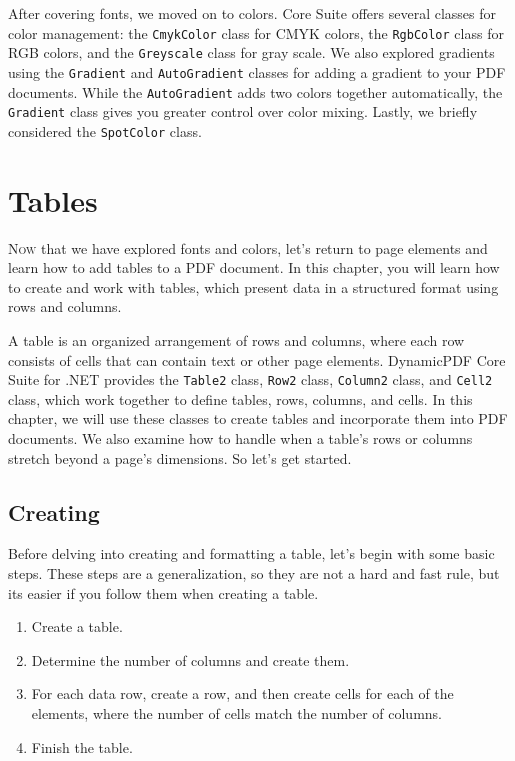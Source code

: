 \documentclass[american,letterpaper]{tufte-book}
\numberwithin{equation}{section}
\numberwithin{figure}{section}
\def\color#1{}%
\begin{document}
{After covering fonts, we moved on to colors. Core Suite offers several classes for color management: the \texttt{CmykColor} class for CMYK colors, the \texttt{RgbColor}
class for RGB colors, and the \texttt{Greyscale} class for gray scale.
We also explored gradients using the \texttt{Gradient} and \texttt{AutoGradient}
classes for adding a gradient to your PDF documents. While the \texttt{AutoGradient}
adds two colors together automatically, the \texttt{Gradient} class gives you greater control over color mixing. Lastly, we briefly considered the \texttt{SpotColor} class.


\color{white}
\chapter{Tables}\label{chap:Tables}
\color{black}
\BgThispage
\vspace{8.00em}
\lettrine[lines=2,lhang=0.1]{N}{ow} that we have explored fonts and colors, let's return to page elements and learn how to add tables to a PDF document. In this chapter, you will learn how to create and work with tables, which present data in a structured format using rows and columns.

A table is an organized arrangement of rows and columns, where each row consists of cells that can contain text or other page elements. DynamicPDF Core Suite for .NET provides the
\texttt{Table2} class, \texttt{Row2} class, \texttt{Column2} class,
and \texttt{Cell2} class, which work together to define tables, rows, columns, and cells. In this chapter, we will use these classes to create tables and incorporate them into PDF documents. We also examine how to handle when a table's rows or columns stretch beyond a page's dimensions.  So let's get started.

\section{Creating}

Before delving into creating and formatting a table, let's begin with
some basic steps. These steps are a generalization, so they are not
a hard and fast rule, but its easier if you follow them when creating
a table.
\begin{enumerate}
\item Create a table.
\item Determine the number of columns and create them.
\item For each data row, create a row, and then create cells for each of
the elements, where the number of cells match the number of columns.
\item Finish the table.
\end{enumerate}

}
\end{document}
